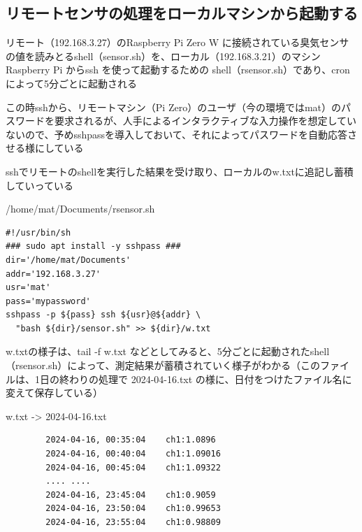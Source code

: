 \documentclass[12pt,a4j]{jsbook}
\begin{document}

\newpage

\subsection{リモートセンサの処理をローカルマシンから起動する}

リモート（192.168.3.27）のRaspberry Pi Zero W に接続されている臭気センサの値を読みとるshell（sensor.sh）を、ローカル（192.168.3.21）のマシンRaspberry Pi からssh を使って起動するための shell（rsensor.sh）であり、cronによって5分ごとに起動される

この時sshから、リモートマシン（Pi Zero）のユーザ（今の環境ではmat）のパスワードを要求されるが、人手によるインタラクティブな入力操作を想定していないので、予めsshpassを導入しておいて、それによってパスワードを自動応答させる様にしている

sshでリモートのshellを実行した結果を受け取り、ローカルのw.txtに追記し蓄積していっている

\begin{spacing}{0.95}
\begin{itembox}[l]{/home/mat/Documents/rsensor.sh}
\begin{verbatim}
#!/usr/bin/sh
### sudo apt install -y sshpass ###
dir='/home/mat/Documents'
addr='192.168.3.27'
usr='mat'
pass='mypassword'
sshpass -p ${pass} ssh ${usr}@${addr} \
  "bash ${dir}/sensor.sh" >> ${dir}/w.txt
\end{verbatim}
\end{itembox}
\end{spacing}

w.txtの様子は、tail -f w.txt などとしてみると、5分ごとに起動されたshell（rsensor.sh）によって、測定結果が蓄積されていく様子がわかる（このファイルは、1日の終わりの処理で 2024-04-16.txt の様に、日付をつけたファイル名に変えて保存している）

\begin{spacing}{0.95}
\begin{itembox}[l]{w.txt -> 2024-04-16.txt}
\begin{verbatim}
		2024-04-16, 00:35:04	ch1:1.0896
		2024-04-16, 00:40:04	ch1:1.09016
		2024-04-16, 00:45:04	ch1:1.09322
		.... ....
		2024-04-16, 23:45:04	ch1:0.9059
		2024-04-16, 23:50:04	ch1:0.99653
		2024-04-16, 23:55:04	ch1:0.98809
\end{verbatim}
\end{itembox}
\end{spacing}
\end{document}
